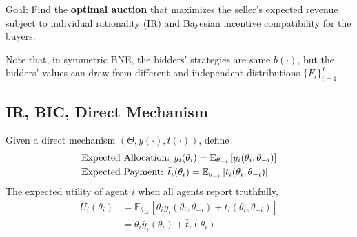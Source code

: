 \documentclass[11pt]{elegantbook}
\begin{document}

\underline{Goal:} Find the \textbf{optimal auction} that maximizes the seller's expected revenue subject to individual rationality (IR) and Bayesian incentive compatibility for the buyers.


\begin{note}
    Note that, in symmetric BNE, the bidders' strategies are same $b(\cdot)$, but the bidders' values can draw from different and independent distributions $\{F_i\}_{i=1}^I$
\end{note}


\subsection{IR, BIC, Direct Mechanism}
Given a direct mechanism $\left(\Theta,y(\cdot),t(\cdot)\right)$, define
\begin{equation}
    \begin{aligned}
        &\textnormal{Expected Allocation: } \bar{y}_i(\theta_i)=\mathbb{E}_{\theta_{-i}}\left[y_i(\theta_i,\theta_{-i})\right]\\
        &\textnormal{Expected Payment: } \bar{t}_i(\theta_i)=\mathbb{E}_{\theta_{-i}}\left[t_i(\theta_i,\theta_{-i})\right]
    \end{aligned}
    \nonumber
\end{equation}
The expected utility of agent $i$ when all agents report truthfully,
\begin{equation}
    \begin{aligned}
        U_i(\theta_i)&=\mathbb{E}_{\theta_{-i}}\left[\theta_iy_i(\theta_i,\theta_{-i})+t_i(\theta_i,\theta_{-i})\right]\\
        &=\theta_i \bar{y}_i(\theta_i)+\bar{t}_i(\theta_i)
    \end{aligned}
    \nonumber
\end{equation}
\end{document}
